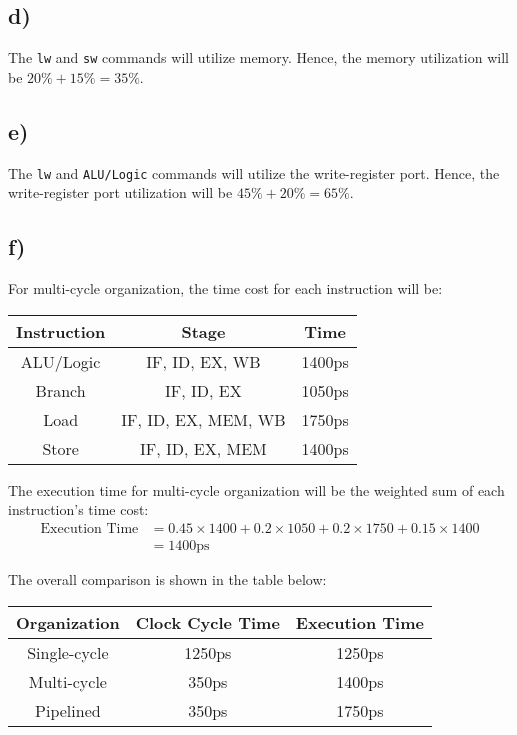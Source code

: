 \documentclass[a4paper,12pt]{article}
\begin{document}
\subsection*{d)}

The \texttt{lw} and \texttt{sw} commands will utilize memory.
Hence, the memory utilization will be $20\% + 15\% = 35\%$.

\subsection*{e)}

The \texttt{lw} and \texttt{ALU/Logic} commands will utilize the write-register port.
Hence, the write-register port utilization will be $45\% + 20\% = 65\%$.

\subsection*{f)}

For multi-cycle organization, the time cost for each instruction will be:
\begin{center}
	\begin{tabular}{ccc}
		\toprule
		Instruction & Stage & Time \\
		\midrule
		ALU/Logic & IF, ID, EX, WB & 1400ps \\
		Branch & IF, ID, EX & 1050ps \\
		Load & IF, ID, EX, MEM, WB & 1750ps \\
		Store & IF, ID, EX, MEM & 1400ps \\
		\bottomrule
	\end{tabular}
\end{center}

The execution time for multi-cycle organization will be the weighted sum of each instruction's time cost:
\begin{align*}
	\text{Execution Time} &= 0.45 \times 1400 + 0.2 \times 1050 + 0.2 \times 1750 + 0.15 \times 1400 \\
	&= 1400 \text{ps}
\end{align*}

The overall comparison is shown in the table below:
\begin{center}
	\begin{tabular}{ccc}
		\toprule
		Organization & Clock Cycle Time & Execution Time \\
		\midrule
		Single-cycle & 1250ps & 1250ps \\
		Multi-cycle & 350ps & 1400ps \\
		Pipelined & 350ps & 1750ps \\
		\bottomrule
	\end{tabular}
\end{center}
\end{document}
